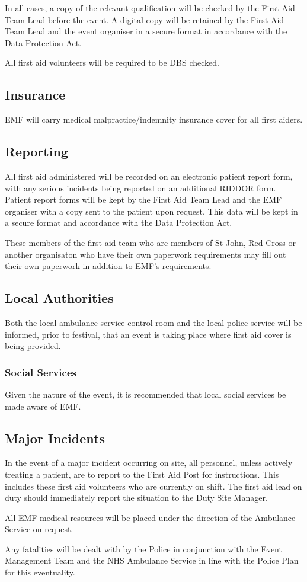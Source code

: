 In all cases, a copy of the relevant qualification will be checked by the
First Aid Team Lead before the event. A digital copy will be retained by the
First Aid Team Lead and the event organiser in a secure format in accordance
with the Data Protection Act.

All first aid volunteers will be required to be DBS checked.

\subsection{Insurance}
EMF will carry medical malpractice/indemnity insurance cover for all first aiders.

\subsection{Reporting}
All first aid administered will be recorded on an electronic
patient report form, with any serious incidents being reported on an
additional RIDDOR form. Patient report forms will be kept by the First Aid Team
Lead and the EMF organiser with a copy sent to the patient upon request. This
data will be kept in a secure format and accordance with the Data Protection
Act.

These members of the first aid team who are members of St John, Red Cross or another
organisaton who have their own paperwork requirements may fill out their own paperwork
in addition to EMF's requirements.

\subsection{Local Authorities}
Both the local ambulance service control room and the local police service will
be informed, prior to festival, that an event is taking place where first aid
cover is being provided.

\subsubsection{Social Services}

Given the nature of the event, it is recommended that local social services be
made aware of EMF.

\subsection{Major Incidents}

In the event of a major incident occurring on site, all personnel, unless
actively treating a patient, are to report to the First Aid Post for
instructions. This includes these first aid volunteers who are currently on
shift. The first aid lead on duty should immediately report the situation to the
Duty Site Manager.

All EMF medical resources will be placed under the direction of the Ambulance
Service on request.

Any fatalities will be dealt with by the Police in conjunction with the Event
Management Team and the NHS Ambulance Service in line with the Police Plan for
this eventuality.
